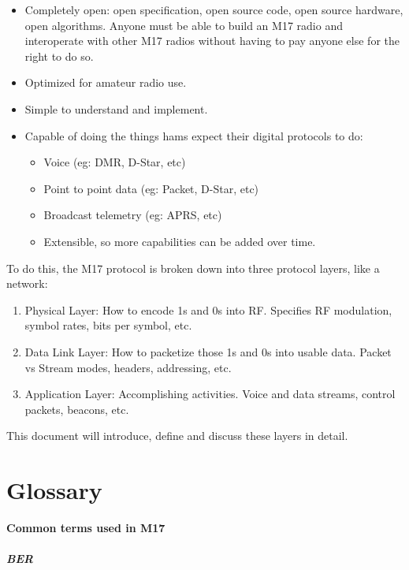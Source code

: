 \documentclass[a4paper,11pt,oneside]{book}
\begin{document}
\begin{itemize}
	\item
	Completely open: open specification, open source code, open source hardware, open algorithms. Anyone must be able to build an M17 radio and interoperate with other M17 radios without having to pay anyone else for the right to do so.
	\item
	Optimized for amateur radio use.
	\item
	Simple to understand and implement.
	\item
	Capable of doing the things hams expect their digital protocols to do:
	\begin{itemize}
		\item
		Voice (eg: DMR, D-Star, etc)
		\item
		Point to point data (eg: Packet, D-Star, etc)
		\item
		Broadcast telemetry (eg: APRS, etc)
		\item
		Extensible, so more capabilities can be added over time.
	\end{itemize}
\end{itemize}

To do this, the M17 protocol is broken down into three protocol layers,
like a network:

\begin{enumerate}
	\def\labelenumi{\arabic{enumi}.}
	\item
	Physical Layer: How to encode 1s and 0s into RF\@. Specifies RF modulation, symbol rates, bits per symbol, etc.
	\item
	Data Link Layer: How to packetize those 1s and 0s into usable data. Packet vs Stream modes, headers, addressing, etc.
	\item
	Application Layer: Accomplishing activities. Voice and data streams, control packets, beacons, etc.
\end{enumerate}

This document will introduce, define and discuss these layers in detail.

\chapter{Glossary}

\textbf{Common terms used in M17}

\paragraph{BER}
\end{document}
